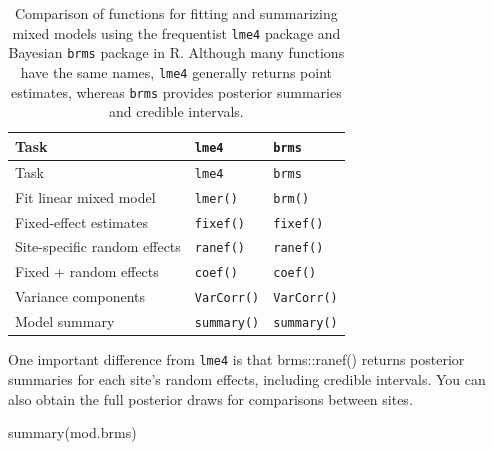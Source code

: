 \documentclass[
  13,
  letterpaper,
]{report}
\newenvironment{Shaded}{\begin{snugshade}}{\end{snugshade}}
\newcommand{\FunctionTok}[1]{\textcolor[rgb]{0.28,0.35,0.67}{#1}}
\newcommand{\NormalTok}[1]{\textcolor[rgb]{0.00,0.23,0.31}{#1}}
\begin{document}
\begin{longtable}[]{@{}lll@{}}
\caption{Comparison of functions for fitting and summarizing mixed
models using the frequentist \protect\texttt{lme4} package and Bayesian
\protect\texttt{brms} package in R. Although many functions have the
same names, \protect\texttt{lme4} generally returns point estimates,
whereas \protect\texttt{brms} provides posterior summaries and credible
intervals.}\label{tbl-lme4-brms}\tabularnewline
\toprule\noalign{}
Task & \texttt{lme4} & \texttt{brms} \\
\midrule\noalign{}
\endfirsthead
\toprule\noalign{}
Task & \texttt{lme4} & \texttt{brms} \\
\midrule\noalign{}
\endhead
\bottomrule\noalign{}
\endlastfoot
Fit linear mixed model & \texttt{lmer()} & \texttt{brm()} \\
Fixed-effect estimates & \texttt{fixef()} & \texttt{fixef()} \\
Site-specific random effects & \texttt{ranef()} & \texttt{ranef()} \\
Fixed + random effects & \texttt{coef()} & \texttt{coef()} \\
Variance components & \texttt{VarCorr()} & \texttt{VarCorr()} \\
Model summary & \texttt{summary()} & \texttt{summary()} \\
\end{longtable}

One important difference from \texttt{lme4} is that brms::ranef()
returns posterior summaries for each site's random effects, including
credible intervals. You can also obtain the full posterior draws for
comparisons between sites.

\begin{Shaded}
\begin{Highlighting}[]
\FunctionTok{summary}\NormalTok{(mod.brms)}
\end{Highlighting}
\end{Shaded}
\end{document}

